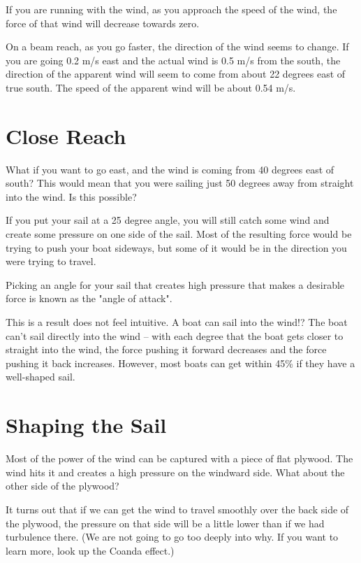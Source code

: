 If you are running with the wind, as you approach the speed of the wind,  the force of that wind will decrease towards zero.

On a beam reach, as you go faster, the direction of the wind seems to change. If you are going 0.2 m/s east and the actual wind is 0.5 m/s from the south, the direction of the 
apparent wind will seem to come from about 22 degrees east of true south.  The speed of the apparent wind will be about 0.54 m/s.

\section{Close Reach}

What if you want to go east,  and the wind is coming from 40 degrees east of south?  This would mean that you were sailing just 50 degrees away from 
straight into the wind. Is this possible?

If you put your sail at a 25 degree angle, you will still catch some wind and create some pressure on one side of the sail.  Most of the resulting force would be trying to push
your boat sideways,  but some of it would be in the direction you were trying to travel. 

Picking an angle for your sail that creates high pressure that makes a desirable force is known as the "angle of attack".

This is a result does not feel intuitive. A boat can sail into the wind!? The boat can't sail directly into the wind -- with each degree that the boat gets closer
to straight into the wind,  the force pushing it forward decreases and the force pushing it back increases. However,  most boats can get within 45\% if they have a well-shaped sail.

\section{Shaping the Sail}

Most of the power of the wind can be captured with a piece of flat plywood.  The wind hits it and creates a high pressure on the windward side. What about the other side of the plywood?

It turns out that if we can get the wind to travel smoothly over the back side of the plywood,   the pressure on that side will be a little lower than if we had turbulence there.   (We are not going
to go too deeply into why. If you want to learn more, look up the Coanda effect.)

